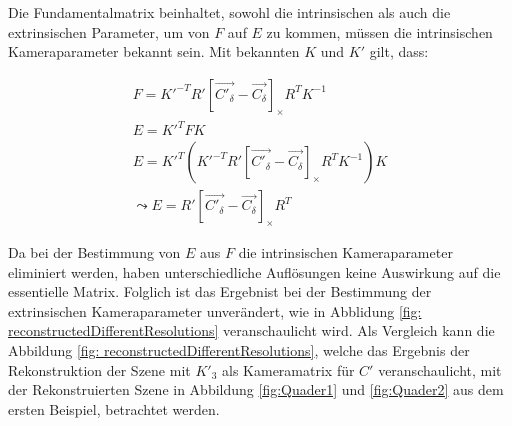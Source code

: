 Die Fundamentalmatrix beinhaltet, sowohl die intrinsischen als auch die extrinsischen Parameter, um von $F$ auf $E$ zu kommen, müssen die intrinsischen Kameraparameter bekannt sein. Mit bekannten $K$ und $K'$ gilt, dass:

\begin{gather}
	F = K'^{-T}R' \left[ \vec{C'_\delta}-\vec{C_\delta}\right]_\times R^TK^{-1}\\
	E = K'^{T}FK\\
	E= K'^T (K'^{-T}R' \left[ \vec{C'_\delta}-\vec{C_\delta}\right]_\times R^TK^{-1}) K\\
	\leadsto E = R' \left[ \vec{C'_\delta}-\vec{C_\delta}\right]_\times R^T		
\end{gather}

Da bei der Bestimmung von $E$ aus $F$ die intrinsischen Kameraparameter eliminiert werden, haben unterschiedliche Auflösungen keine Auswirkung auf die essentielle Matrix. Folglich ist das Ergebnist bei der Bestimmung der extrinsischen Kameraparameter unverändert, wie in Abblidung \ref{fig: reconstructedDifferentResolutions} veranschaulicht wird. Als Vergleich kann die Abbildung \ref{fig: reconstructedDifferentResolutions}, welche das Ergebnis der Rekonstruktion der Szene mit $K'_3$ als Kameramatrix für $C'$ veranschaulicht, mit der Rekonstruierten Szene in Abbildung 	\ref{fig:Quader1} und \ref{fig:Quader2} aus dem ersten Beispiel, betrachtet werden.  




